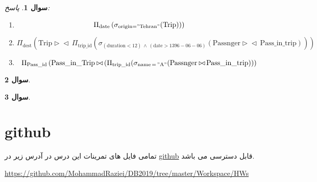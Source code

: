 \documentclass[10pt]{article}
\newtheorem{question}{سوال}
\newcommand{\prd}{\triangleright\!\!\triangleleft\,}
\begin{document}
\begin{question}
	پاسخ:
\begin{latin}
\begin{enumerate}[label=\alph*)]
\item

	$$
	\Pi_{\mathrm{date}}\left(\sigma_{\text{origin}=\mathrm{"Tehran"}}(\mathrm{Trip}))\right)
	$$
\item 
	\[
	\Pi_{\mathrm{dest}} \left(
	\mathrm{Trip} \prd \Pi_\mathrm{trip\_id}(\sigma_\mathrm{(duration < 12)\,\wedge\,(date > 1396-06-06)}
	(
	\mathrm{Passnger}\prd \mathrm{Pass\_in\_trip}
	))
	\right)
	\]
	

\item 
	\[
	\Pi_{\mathrm{Pass\_id}} \left(
	\mathrm{Pass\_in\_Trip} \prd (\Pi_\mathrm{trip\_id}(\sigma_\mathrm{name\,=\,"A"}
	(
	\mathrm{Passnger}\prd \mathrm{Pass\_in\_trip}
	))
	\right)
	\]


\end{enumerate}
\end{latin}
\end{question}
\begin{question}

\end{question}
\begin{question}

\end{question}








\section{github}\label{chpt2}
تمامی فایل های تمرینات این درس در آدرس زیر در 
\href{https://github.com/mohammadraziei/DB2019/}{github}
قابل دسترسی می باشد.

\begin{latin}
\begin{center}
\href{https://github.com/MohammadRaziei/DB2019/tree/master/Workspace/HWs}{https://github.com/MohammadRaziei/DB2019/tree/master/Workspace/HWs}
\end{center}
\end{latin}
\end{document}
